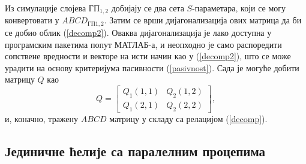 \documentclass[main.tex]{subfiles}
\begin{document}
Из симулације слојева $ГП_{1,2}$ добијају се два сета $S$-параметара, који се могу конвертовати у $ABCD_{ГП1,2}$. Затим се врши дијагонализација ових матрица да би се добио облик (\ref{decomp2}). Оваква дијагонализација је лако доступна у програмским пакетима попут МАТЛАБ-а, и неопходно је само распоредити сопствене вредности и векторе на исти начин као у (\ref{decomp2}), што се може урадити на основу критеријума пасивности (\ref{pasivnost}). Сада је могуће добити матрицу $Q$ као
\begin{equation}
Q =
\begin{bmatrix}
Q_1(1,1) & Q_2(1,2) \\
Q_1(2,1) & Q_2(2,2)
\end{bmatrix},
\end{equation}
и, коначно, тражену $ABCD$ матрицу у складу са релацијом (\ref{decomp}).

\subsection{Јединичне ћелије са паралелним процепима}
\end{document}
